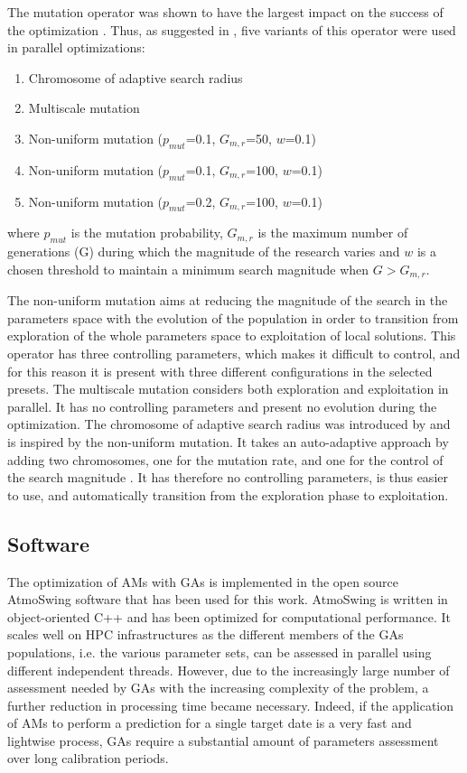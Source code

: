 \documentclass[draft]{agujournal2019}
\begin{document}
The mutation operator was shown to have the largest impact on the success of the optimization \cite{Horton2017a}. Thus, as suggested in , five variants of this operator were used in parallel optimizations: 

\begin{enumerate}
	\item Chromosome of adaptive search radius
	\item Multiscale mutation
	\item Non-uniform mutation ($p_{mut}$=0.1, $G_{m,r}$=50, $w$=0.1)
	\item Non-uniform mutation ($p_{mut}$=0.1, $G_{m,r}$=100, $w$=0.1)
	\item Non-uniform mutation ($p_{mut}$=0.2, $G_{m,r}$=100, $w$=0.1)
\end{enumerate}

where $p_{mut}$ is the mutation probability, $G_{m,r}$ is the maximum number of generations (G) during which the magnitude of the research varies and $w$ is a chosen threshold to maintain a minimum search magnitude when $G>G_{m,r}$.

The non-uniform mutation \cite{Michalewicz1996} aims at reducing the magnitude of the search in the parameters space with the evolution of the population in order to transition from exploration of the whole parameters space to exploitation of local solutions. This operator has three controlling parameters, which makes it difficult to control, and for this reason it is present with three different configurations in the selected presets. The multiscale mutation considers both exploration and exploitation in parallel. It has no controlling parameters and present no evolution during the optimization. The chromosome of adaptive search radius was introduced by  and is inspired by the non-uniform mutation. It takes an auto-adaptive approach by adding two chromosomes, one for the mutation rate, and one for the control of the search magnitude \cite<see details in>{Horton2017a}. It has therefore no controlling parameters, is thus easier to use, and automatically transition from the exploration phase to exploitation. 


\subsection{Software}
\label{software}

The optimization of AMs with GAs is implemented in the open source AtmoSwing software \cite{Horton2019} that has been used for this work. AtmoSwing is written in object-oriented C++ and has been optimized for computational performance. It scales well on HPC infrastructures as the different members of the GAs populations, i.e. the various parameter sets, can be assessed in parallel using different independent threads. However, due to the increasingly large number of assessment needed by GAs with the increasing complexity of the problem, a further reduction in processing time became necessary. Indeed, if the application of AMs to perform a prediction for a single target date is a very fast and lightwise process, GAs require a substantial amount of parameters assessment over long calibration periods.
\end{document}
